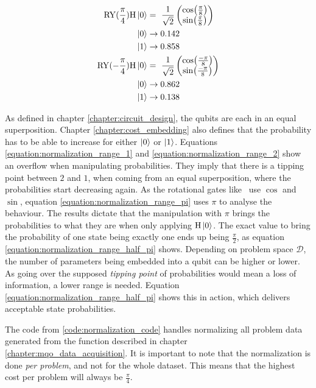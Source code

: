 \begin{equation}
    \centering
    \begin{split}
        \mathrm{RY}(\frac{\pi}{4})\mathrm{H}\ket{0} &=\ \frac{1}{\sqrt{2}}\begin{pmatrix}\cos(\frac{\pi}{8}) \\ \sin(\frac{\pi}{8})\end{pmatrix}\\
        \ket{0} &\to 0.142 \\
        \ket{1} &\to 0.858 \\
        \mathrm{RY}(-\frac{\pi}{4})\mathrm{H}\ket{0} &=\ \frac{1}{\sqrt{2}}\begin{pmatrix}\cos(\frac{-\pi}{8}) \\ \sin(\frac{-\pi}{8})\end{pmatrix}\\
        \ket{0} &\to 0.862 \\
        \ket{1} &\to 0.138 \\
    \end{split}
    \label{equation:normalization_range_forth_pi}
\end{equation}

As defined in chapter \ref{chapter:circuit_design}, the qubits are each in an equal superposition. Chapter \ref{chapter:cost_embedding} also defines that the probability has to be able to increase for either $\ket{0}$ or $\ket{1}$. Equations \ref{equation:normalization_range_1} and \ref{equation:normalization_range_2} show an overflow when manipulating probabilities. They imply that there is a tipping point between $2$ and $1$, when coming from an equal superposition, where the probabilities start decreasing again. As the rotational gates like \rygate\ use $\cos$ and $\sin$, equation \ref{equation:normalization_range_pi} uses $\pi$ to analyse the behaviour. The results dictate that the manipulation with $\pi$ brings the probabilities to what they are when only applying $\mathrm{H}\ket{0}$. The exact value to bring the probability of one state being exactly one ends up being $\frac{\pi}{2}$, as equation \ref{equation:normalization_range_half_pi} shows. Depending on problem space $\mathcal{D}$, the number of parameters being embedded into a qubit can be higher or lower. As going over the supposed \emph{tipping point} of probabilities would mean a loss of information, a lower range is needed. Equation \ref{equation:normalization_range_half_pi} shows this in action, which delivers acceptable state probabilities.\par
The code from \ref{code:normalization_code} handles normalizing all problem data generated from the function described in chapter \ref{chapter:mqo_data_acquisition}. It is important to note that the normalization is done \emph{per problem}, and not for the whole dataset. This means that the highest cost per problem will always be $\frac{\pi}{4}$.

